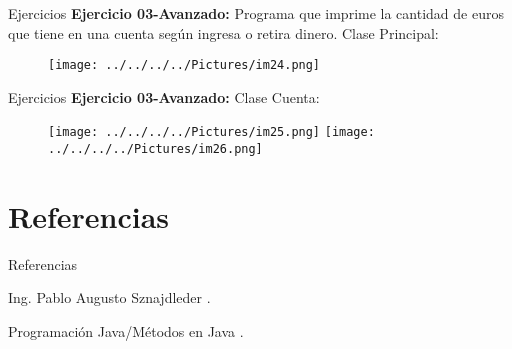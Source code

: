 \documentclass[11pt]{beamer}
\begin{document}
		\begin{frame}{Ejercicios
}
			\justifying
			\textbf{Ejercicio 03-Avanzado: }Programa que imprime la cantidad de euros que tiene en una cuenta según ingresa o retira dinero. Clase Principal:
			\begin{figure}[hbtp]
		\centering
		\texttt{[image: ../../../../Pictures/im24.png]}
		\end{figure}
		 
		\end{frame}
		\begin{frame}{Ejercicios
}
			\justifying
			\textbf{Ejercicio 03-Avanzado: }Clase Cuenta:
			\begin{figure}[hbtp]
		\centering
		\texttt{[image: ../../../../Pictures/im25.png]}
		\texttt{[image: ../../../../Pictures/im26.png]}
		
		\end{figure}
		 
		\end{frame}
		
		
		
		
\section{Referencias}

\begin{frame}{Referencias}

\begin{thebibliography}{10}
	
	\beamertemplatearticlebibitems
	
	Ing. Pablo Augusto Sznajdleder
	.
	
	\beamertemplateonlinebibitems
	Programación Java/Métodos en Java
	.
	
	
	
	
	
\end{thebibliography}
\end{frame}
\end{document}
